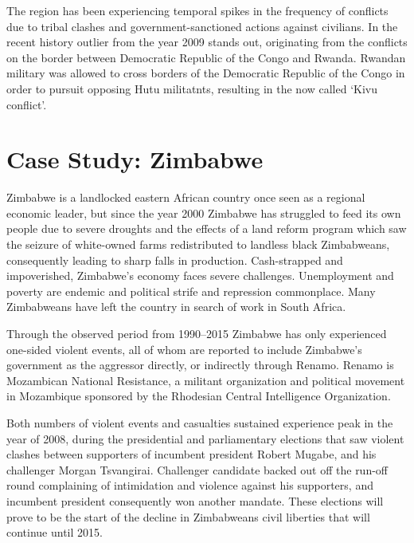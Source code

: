 \documentclass[a4paper,11pt]{article}
\begin{document}
The region has been experiencing temporal spikes in the frequency of conflicts due to tribal clashes and government-sanctioned actions against civilians. In the recent history outlier from the year 2009 stands out, originating from the conflicts on the border between Democratic Republic of the Congo and Rwanda. Rwandan military was allowed to cross borders of the Democratic Republic of the Congo in order to pursuit opposing Hutu militatnts, resulting in the now called ‘Kivu conflict’.

\section{Case Study: Zimbabwe}
Zimbabwe is a landlocked eastern African country once seen as a regional economic leader, but since the year 2000 Zimbabwe has struggled to feed its own people due to severe droughts and the effects of a land reform program which saw the seizure of white-owned farms redistributed to landless black Zimbabweans, consequently leading to sharp falls in production. Cash-strapped and impoverished, Zimbabwe's economy faces severe challenges. Unemployment and poverty are endemic and political strife and repression commonplace. Many Zimbabweans have left the country in search of work in South Africa.

Through the observed period from 1990--2015 Zimbabwe has only experienced one-sided violent events, all of whom are reported to include Zimbabwe’s government as the aggressor directly, or indirectly through Renamo. Renamo is Mozambican National Resistance, a militant organization and political movement in Mozambique sponsored by the Rhodesian Central Intelligence Organization.

Both numbers of violent events and casualties sustained experience peak in the year of 2008, during the presidential and parliamentary elections that saw violent clashes between supporters of incumbent president Robert Mugabe, and his challenger Morgan Tsvangirai. Challenger candidate backed out off the run-off round complaining of intimidation and violence against his supporters, and incumbent president consequently won another mandate. These elections will prove to be the start of the decline in Zimbabweans civil liberties that will continue until 2015.
\end{document}
